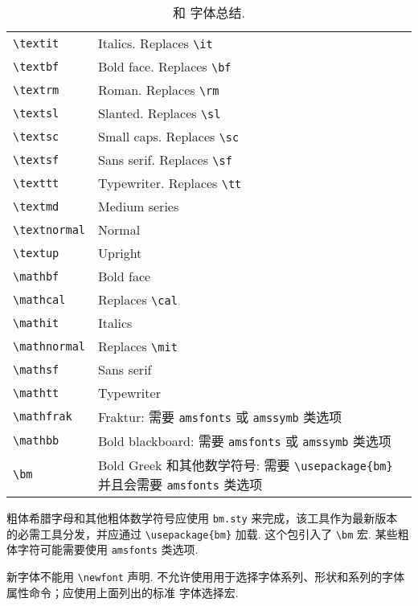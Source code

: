 \documentclass[twocolumn, amssymb, bibnotes, aps, prd, 10pt]{revtex4-2}
\newcommand{\classoption}[1]{\texttt{#1}}
\newcommand{\macro}[1]{\texttt{\textbackslash#1}}
\newcommand{\m}[1]{\macro{#1}}
\begin{document}
\begin{table}
\caption{\label{tab:fonts}{} 和  字体总结.}
\begin{ruledtabular}
    \begin{tabular}{lp{2in}}
        \m{textit} & Italics. Replaces \m{it}\\
        \m{textbf} & Bold face. Replaces \m{bf}\\
        \m{textrm} & Roman. Replaces \m{rm}\\
        \m{textsl} & Slanted. Replaces \m{sl}\\
        \m{textsc} & Small caps. Replaces \m{sc}\\
        \m{textsf} & Sans serif. Replaces \m{sf}\\
        \m{texttt} & Typewriter. Replaces \m{tt}\\
        \m{textmd} & Medium series\\
        \m{textnormal} & Normal\\
        \m{textup} & Upright\\
        \m{mathbf} & Bold face\\
        \m{mathcal} & Replaces \m{cal}\\
        \m{mathit} & Italics\\
        \m{mathnormal} & Replaces \m{mit}\\
        \m{mathsf} & Sans serif\\
        \m{mathtt} & Typewriter\\
        \m{mathfrak} & Fraktur: 需要 \classoption{amsfonts} 或 \classoption{amssymb} 类选项\\
        \m{mathbb} & Bold blackboard: 需要 \classoption{amsfonts} 或 \classoption{amssymb} 类选项\\
        \m{bm} & Bold Greek 和其他数学符号: 需要
        \verb+\usepackage{bm}+ 并且会需要 \classoption{amsfonts} 类选项
    \end{tabular}
\end{ruledtabular}
\end{table}

粗体希腊字母和其他粗体数学符号应使用 \texttt{bm.sty} 来完成，该工具作为最新版本 {} 的必需工具分发，并应通过 \verb+\usepackage{bm}+ 加载. 这个包引入了 \m{bm} 宏. 某些粗体字符可能需要使用 \classoption{amsfonts} 类选项.

新字体不能用 \m{newfont} 声明. 不允许使用用于选择字体系列、形状和系列的字体属性命令；应使用上面列出的标准 {} 字体选择宏.
\end{document}

